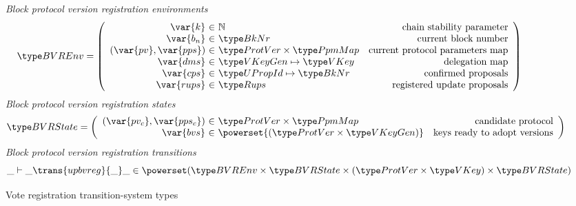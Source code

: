 \begin{figure}[htb]
  \emph{Block protocol version registration environments}
  \begin{align*}
    & \BVREnv
      = \left(
      \begin{array}{r@{~\in~}lr}
        \var{k} & \mathbb{N} & \text{chain stability parameter}\\
        \var{b_n} & \BkNr & \text{current block number}\\
        (\var{pv}, \var{pps}) & \ProtVer \times \PPMMap
                             & \text{current protocol parameters map}\\
        \var{dms} & \VKeyGen \mapsto \VKey & \text{delegation map}\\
        \var{cps} & \UPropId \mapsto \BkNr & \text{confirmed proposals}\\
        \var{rups} & \Rups
                             & \text{registered update proposals}\\
      \end{array}\right)
  \end{align*}
  \emph{Block protocol version registration states}
  \begin{align*}
    & \BVRState
      = \left(
      \begin{array}{r@{~\in~}lr}
        (\var{pv_c}, \var{pps_c}) & \ProtVer \times \PPMMap
        & \text{candidate protocol}\\
        \var{bvs} & \powerset{(\ProtVer \times \VKeyGen)}
        & \text{keys ready to adopt versions}
      \end{array}\right)
  \end{align*}
  \emph{Block protocol version registration transitions}
    \begin{equation*}
    \_ \vdash \_ \trans{upbvreg}{\_} \_ \in
    \powerset (\BVREnv \times \BVRState
    \times (\ProtVer \times \VKey) \times \BVRState)
    \end{equation*}
  \caption{Vote registration transition-system types}
  \label{fig:ts-types:up-bv-reg}
\end{figure}

